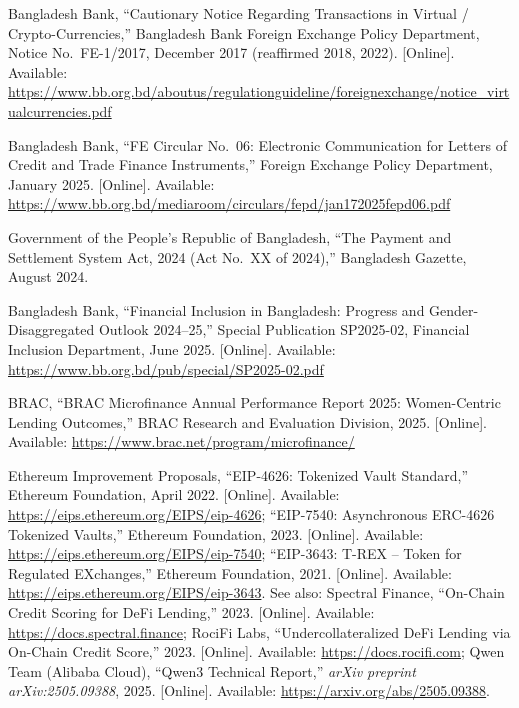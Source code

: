 \documentclass[12pt,a4paper]{report}
\begin{document}
{\begin{enumerate}[label={[\arabic*]}]
\item Bangladesh Bank, ``Cautionary Notice Regarding Transactions in Virtual / Crypto-Currencies,'' Bangladesh Bank Foreign Exchange Policy Department, Notice No.~FE-1/2017, December 2017 (reaffirmed 2018, 2022). [Online]. Available: \url{https://www.bb.org.bd/aboutus/regulationguideline/foreignexchange/notice_virtualcurrencies.pdf}

\item Bangladesh Bank, ``FE Circular No.~06: Electronic Communication for Letters of Credit and Trade Finance Instruments,'' Foreign Exchange Policy Department, January 2025. [Online]. Available: \url{https://www.bb.org.bd/mediaroom/circulars/fepd/jan172025fepd06.pdf}

\item Government of the People's Republic of Bangladesh, ``The Payment and Settlement System Act, 2024 (Act No.~XX of 2024),'' Bangladesh Gazette, August 2024.

\item Bangladesh Bank, ``Financial Inclusion in Bangladesh: Progress and Gender-Disaggregated Outlook 2024--25,'' Special Publication SP2025-02, Financial Inclusion Department, June 2025. [Online]. Available: \url{https://www.bb.org.bd/pub/special/SP2025-02.pdf}

\item BRAC, ``BRAC Microfinance Annual Performance Report 2025: Women-Centric Lending Outcomes,'' BRAC Research and Evaluation Division, 2025. [Online]. Available: \url{https://www.brac.net/program/microfinance/}

\item Ethereum Improvement Proposals, ``EIP-4626: Tokenized Vault Standard,'' Ethereum Foundation, April 2022. [Online]. Available: \url{https://eips.ethereum.org/EIPS/eip-4626}; ``EIP-7540: Asynchronous ERC-4626 Tokenized Vaults,'' Ethereum Foundation, 2023. [Online]. Available: \url{https://eips.ethereum.org/EIPS/eip-7540}; ``EIP-3643: T-REX -- Token for Regulated EXchanges,'' Ethereum Foundation, 2021. [Online]. Available: \url{https://eips.ethereum.org/EIPS/eip-3643}. See also: Spectral Finance, ``On-Chain Credit Scoring for DeFi Lending,'' 2023. [Online]. Available: \url{https://docs.spectral.finance}; RociFi Labs, ``Undercollateralized DeFi Lending via On-Chain Credit Score,'' 2023. [Online]. Available: \url{https://docs.rocifi.com}; Qwen Team (Alibaba Cloud), ``Qwen3 Technical Report,'' \textit{arXiv preprint arXiv:2505.09388}, 2025. [Online]. Available: \url{https://arxiv.org/abs/2505.09388}.



\end{enumerate}}
\end{document}
